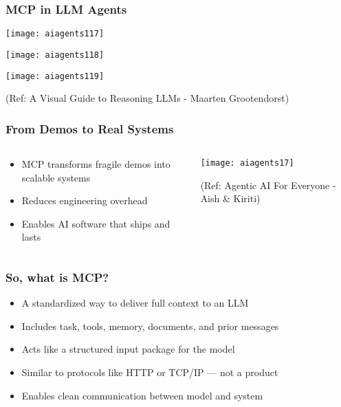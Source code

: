 \begin{frame}[fragile]\frametitle{MCP in LLM Agents}

        \begin{center}
		
        \texttt{[image: aiagents117]}

		\texttt{[image: aiagents118]}
		
		\texttt{[image: aiagents119]}
		

        {\tiny (Ref: A Visual Guide to Reasoning LLMs - Maarten Grootendorst)}
        \end{center}


\end{frame}
\begin{frame}[fragile]\frametitle{From Demos to Real Systems}

\begin{columns}
    \begin{column}[T]{0.5\linewidth}
      \begin{itemize}
        \item MCP transforms fragile demos into scalable systems
        \item Reduces engineering overhead
        \item Enables AI software that ships and lasts
      \end{itemize}

    \end{column}
    \begin{column}[T]{0.5\linewidth}
		\begin{center}
		\texttt{[image: aiagents17]}
		
		{\tiny (Ref: Agentic AI For Everyone - Aish \& Kiriti)}
		\end{center}
    \end{column}
  \end{columns}
  
	
\end{frame}

\begin{frame}[fragile]\frametitle{So, what is MCP?}
      \begin{itemize}
        \item A standardized way to deliver full context to an LLM
        \item Includes task, tools, memory, documents, and prior messages
        \item Acts like a structured input package for the model
        \item Similar to protocols like HTTP or TCP/IP — not a product
        \item Enables clean communication between model and system
      \end{itemize}
\end{frame}

